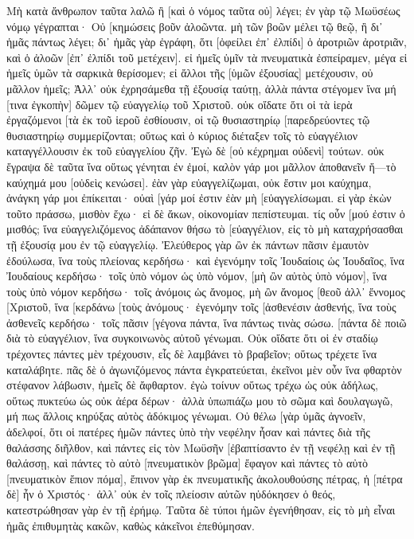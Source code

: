 Μὴ κατὰ ἄνθρωπον ταῦτα λαλῶ ἢ [καὶ ὁ νόμος ταῦτα οὐ] λέγει; 
ἐν γὰρ τῷ Μωϋσέως νόμῳ γέγραπται· Οὐ [κημώσεις βοῦν ἀλοῶντα. μὴ τῶν βοῶν μέλει τῷ θεῷ, 
ἢ δι᾽ ἡμᾶς πάντως λέγει; δι᾽ ἡμᾶς γὰρ ἐγράφη, ὅτι [ὀφείλει ἐπ᾽ ἐλπίδι] ὁ ἀροτριῶν ἀροτριᾶν, καὶ ὁ ἀλοῶν [ἐπ᾽ ἐλπίδι τοῦ μετέχειν]. 
εἰ ἡμεῖς ὑμῖν τὰ πνευματικὰ ἐσπείραμεν, μέγα εἰ ἡμεῖς ὑμῶν τὰ σαρκικὰ θερίσομεν; 
εἰ ἄλλοι τῆς [ὑμῶν ἐξουσίας] μετέχουσιν, οὐ μᾶλλον ἡμεῖς; Ἀλλ᾽ οὐκ ἐχρησάμεθα τῇ ἐξουσίᾳ ταύτῃ, ἀλλὰ πάντα στέγομεν ἵνα μή [τινα ἐγκοπὴν] δῶμεν τῷ εὐαγγελίῳ τοῦ Χριστοῦ. 
οὐκ οἴδατε ὅτι οἱ τὰ ἱερὰ ἐργαζόμενοι [τὰ ἐκ τοῦ ἱεροῦ ἐσθίουσιν, οἱ τῷ θυσιαστηρίῳ [παρεδρεύοντες τῷ θυσιαστηρίῳ συμμερίζονται; 
οὕτως καὶ ὁ κύριος διέταξεν τοῖς τὸ εὐαγγέλιον καταγγέλλουσιν ἐκ τοῦ εὐαγγελίου ζῆν. 
Ἐγὼ δὲ [οὐ κέχρημαι οὐδενὶ] τούτων. οὐκ ἔγραψα δὲ ταῦτα ἵνα οὕτως γένηται ἐν ἐμοί, καλὸν γάρ μοι μᾶλλον ἀποθανεῖν ἤ—τὸ καύχημά μου [οὐδεὶς κενώσει]. 
ἐὰν γὰρ εὐαγγελίζωμαι, οὐκ ἔστιν μοι καύχημα, ἀνάγκη γάρ μοι ἐπίκειται· οὐαὶ [γάρ μοί ἐστιν ἐὰν μὴ [εὐαγγελίσωμαι. 
εἰ γὰρ ἑκὼν τοῦτο πράσσω, μισθὸν ἔχω· εἰ δὲ ἄκων, οἰκονομίαν πεπίστευμαι. 
τίς οὖν [μού ἐστιν ὁ μισθός; ἵνα εὐαγγελιζόμενος ἀδάπανον θήσω τὸ [εὐαγγέλιον, εἰς τὸ μὴ καταχρήσασθαι τῇ ἐξουσίᾳ μου ἐν τῷ εὐαγγελίῳ. 
Ἐλεύθερος γὰρ ὢν ἐκ πάντων πᾶσιν ἐμαυτὸν ἐδούλωσα, ἵνα τοὺς πλείονας κερδήσω· 
καὶ ἐγενόμην τοῖς Ἰουδαίοις ὡς Ἰουδαῖος, ἵνα Ἰουδαίους κερδήσω· τοῖς ὑπὸ νόμον ὡς ὑπὸ νόμον, [μὴ ὢν αὐτὸς ὑπὸ νόμον], ἵνα τοὺς ὑπὸ νόμον κερδήσω· 
τοῖς ἀνόμοις ὡς ἄνομος, μὴ ὢν ἄνομος [θεοῦ ἀλλ᾽ ἔννομος [Χριστοῦ, ἵνα [κερδάνω [τοὺς ἀνόμους· 
ἐγενόμην τοῖς [ἀσθενέσιν ἀσθενής, ἵνα τοὺς ἀσθενεῖς κερδήσω· τοῖς πᾶσιν [γέγονα πάντα, ἵνα πάντως τινὰς σώσω. 
[πάντα δὲ ποιῶ διὰ τὸ εὐαγγέλιον, ἵνα συγκοινωνὸς αὐτοῦ γένωμαι. 
Οὐκ οἴδατε ὅτι οἱ ἐν σταδίῳ τρέχοντες πάντες μὲν τρέχουσιν, εἷς δὲ λαμβάνει τὸ βραβεῖον; οὕτως τρέχετε ἵνα καταλάβητε. 
πᾶς δὲ ὁ ἀγωνιζόμενος πάντα ἐγκρατεύεται, ἐκεῖνοι μὲν οὖν ἵνα φθαρτὸν στέφανον λάβωσιν, ἡμεῖς δὲ ἄφθαρτον. 
ἐγὼ τοίνυν οὕτως τρέχω ὡς οὐκ ἀδήλως, οὕτως πυκτεύω ὡς οὐκ ἀέρα δέρων· 
ἀλλὰ ὑπωπιάζω μου τὸ σῶμα καὶ δουλαγωγῶ, μή πως ἄλλοις κηρύξας αὐτὸς ἀδόκιμος γένωμαι. 
Οὐ θέλω [γὰρ ὑμᾶς ἀγνοεῖν, ἀδελφοί, ὅτι οἱ πατέρες ἡμῶν πάντες ὑπὸ τὴν νεφέλην ἦσαν καὶ πάντες διὰ τῆς θαλάσσης διῆλθον, 
καὶ πάντες εἰς τὸν Μωϋσῆν [ἐβαπτίσαντο ἐν τῇ νεφέλῃ καὶ ἐν τῇ θαλάσσῃ, 
καὶ πάντες τὸ αὐτὸ [πνευματικὸν βρῶμα] ἔφαγον 
καὶ πάντες τὸ αὐτὸ [πνευματικὸν ἔπιον πόμα], ἔπινον γὰρ ἐκ πνευματικῆς ἀκολουθούσης πέτρας, ἡ [πέτρα δὲ] ἦν ὁ Χριστός· 
ἀλλ᾽ οὐκ ἐν τοῖς πλείοσιν αὐτῶν ηὐδόκησεν ὁ θεός, κατεστρώθησαν γὰρ ἐν τῇ ἐρήμῳ. 
Ταῦτα δὲ τύποι ἡμῶν ἐγενήθησαν, εἰς τὸ μὴ εἶναι ἡμᾶς ἐπιθυμητὰς κακῶν, καθὼς κἀκεῖνοι ἐπεθύμησαν. 
